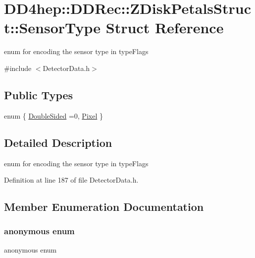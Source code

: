 \hypertarget{struct_d_d4hep_1_1_d_d_rec_1_1_z_disk_petals_struct_1_1_sensor_type}{}\section{D\+D4hep\+:\+:D\+D\+Rec\+:\+:Z\+Disk\+Petals\+Struct\+:\+:Sensor\+Type Struct Reference}
\label{struct_d_d4hep_1_1_d_d_rec_1_1_z_disk_petals_struct_1_1_sensor_type}


enum for encoding the sensor type in type\+Flags  




{\ttfamily \#include $<$Detector\+Data.\+h$>$}

\subsection*{Public Types}
\begin{DoxyCompactItemize}
\item 
enum \{ \hyperlink{struct_d_d4hep_1_1_d_d_rec_1_1_z_disk_petals_struct_1_1_sensor_type_a7adf005f92ce26633f914a97d759d32dad987a4969ad80712a640e43136b96578}{Double\+Sided} =0, 
\hyperlink{struct_d_d4hep_1_1_d_d_rec_1_1_z_disk_petals_struct_1_1_sensor_type_a7adf005f92ce26633f914a97d759d32da73fc4b655f1930a5283de453c1dc406f}{Pixel}
 \}
\end{DoxyCompactItemize}


\subsection{Detailed Description}
enum for encoding the sensor type in type\+Flags 

Definition at line 187 of file Detector\+Data.\+h.



\subsection{Member Enumeration Documentation}
\hypertarget{struct_d_d4hep_1_1_d_d_rec_1_1_z_disk_petals_struct_1_1_sensor_type_a7adf005f92ce26633f914a97d759d32d}{}\label{struct_d_d4hep_1_1_d_d_rec_1_1_z_disk_petals_struct_1_1_sensor_type_a7adf005f92ce26633f914a97d759d32d} 
\subsubsection{\texorpdfstring{anonymous enum}{anonymous enum}}
{\footnotesize\ttfamily anonymous enum}

